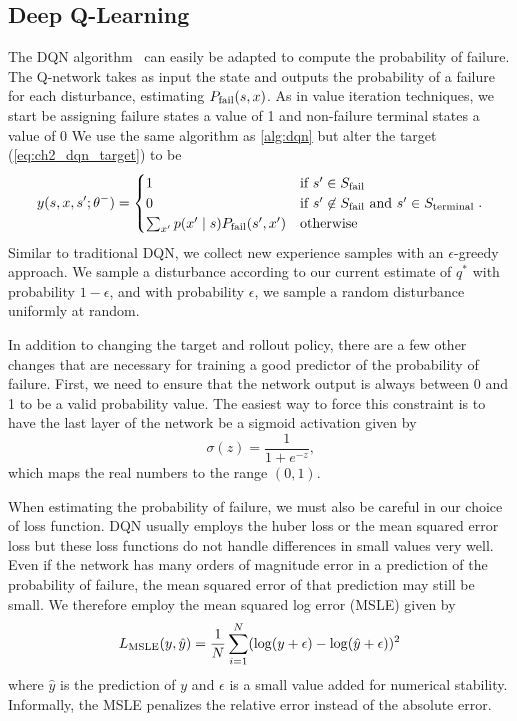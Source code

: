 \subsection{Deep Q-Learning}

The DQN algorithm~\cite{mnih2015human} can easily be adapted to compute the probability of failure. The Q-network takes as input the state and outputs the probability of a failure for each disturbance, estimating $P_{\rm fail}(s, x)$. As in value iteration techniques, we start be assigning failure states a value of \num{1} and non-failure terminal states a value of \num{0} We use the same algorithm as \cref{alg:dqn} but alter the target (\cref{eq:ch2_dqn_target}) to be 
\begin{equation}
    y(s, x, s^\prime; \theta^-) = \begin{cases}
    1 & \text{if } s^\prime \in S_{\rm fail} \\ 
    0 & \text{if } s^\prime \not \in S_{\rm fail} \text{ and } s^\prime \in S_{\rm terminal} \\ 
    \sum_{x^\prime}p(x^\prime \mid s) P_{\rm fail}(s^\prime, x^\prime) & \text{otherwise} \\
    \end{cases} \text{.}
\end{equation}
Similar to traditional DQN, we collect new experience samples with an $\epsilon$-greedy approach. We sample a disturbance according to our current estimate of $q^*$ with probability $1-\epsilon$, and with probability $\epsilon$, we sample a random disturbance uniformly at random.

In addition to changing the target and rollout policy, there are a few other changes that are necessary for training a good predictor of the probability of failure. First, we need to ensure that the network output is always between \num{0} and \num{1} to be a valid probability value. The easiest way to force this constraint is to have the last layer of the network be a sigmoid activation given by 
\begin{equation}
    \sigma(z) = \frac{1}{1 + e^{-z}} \text{,}
\end{equation}
which maps the real numbers to the range $(0,1)$. 

When estimating the probability of failure, we must also be careful in our choice of loss function. DQN usually employs the huber loss or the mean squared error loss but these loss functions do not handle differences in small values very well. Even if the network has many orders of magnitude error in a prediction of the probability of failure, the mean squared error of that prediction may still be small. We therefore employ the mean squared log error (MSLE) given by
\begin{equation}
    L_{\rm MSLE}(y, \hat{y}) = \frac{1}{N}\sum_{i=1}^N (\log(y + \epsilon) - \log(\hat{y} + \epsilon))^2
\end{equation}
where $\hat{y}$ is the prediction of $y$ and $\epsilon$ is a small value added for numerical stability. Informally, the MSLE penalizes the relative error instead of the absolute error. 

